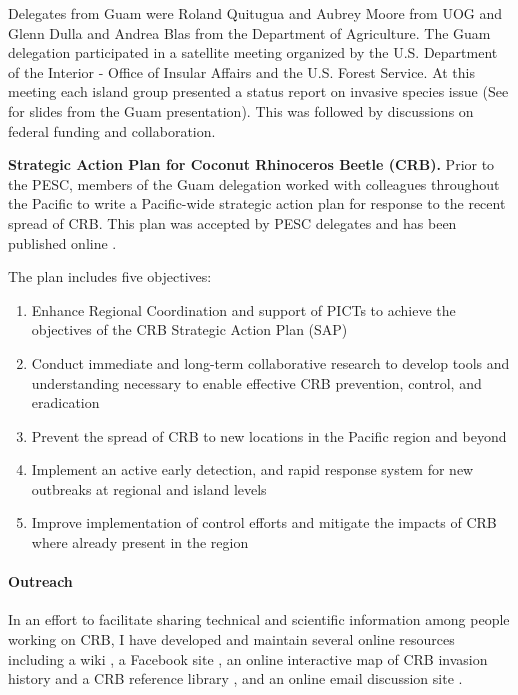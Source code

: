 \begin{refsection}
Delegates from Guam were Roland Quitugua and Aubrey Moore from UOG and Glenn Dulla and Andrea Blas from the Department of Agriculture. The Guam delegation participated in a satellite meeting organized by the U.S. Department of the Interior - Office of Insular Affairs and the U.S. Forest Service. At this meeting each island group presented a status report on invasive species issue (See \parencite{mooreOverviewInvasiveSpecies2022-10-06} for slides from the Guam presentation). This was followed by discussions on federal funding and collaboration.  

\textbf{Strategic Action Plan for Coconut Rhinoceros Beetle (CRB).}
Prior to the PESC, members of the Guam delegation worked with colleagues throughout the Pacific to write a Pacific-wide strategic action plan for response to the recent spread of CRB. This plan was accepted by PESC delegates and has been published online \cite{conferenceStrategicActionPlan2022}.

The plan includes five objectives:

\begin{enumerate}
	\item Enhance Regional Coordination and support of PICTs to achieve the
	objectives of the CRB Strategic Action Plan (SAP)
	\item Conduct immediate and long-term collaborative research to develop
	tools and understanding necessary to enable effective CRB prevention, control, and
	eradication
	\item Prevent the spread of CRB to new locations in the Pacific region and
	beyond
	\item Implement an active early detection, and rapid response system for new
	outbreaks at regional and island levels
	\item Improve implementation of control efforts and mitigate the impacts of
	CRB where already present in the region
	
\end{enumerate} 

\paragraph{Outreach} In an effort to facilitate sharing technical and scientific information among people working on CRB, I have developed and maintain several online resources including a wiki \parencite{moore_crb-g_2019}, a Facebook site \parencite{moore_facebook_2019}, an online interactive map of CRB invasion history \parencite{moore_online_2019} and a CRB reference library \parencite{moore_online_2021}, and an online email discussion site \parencite{moore_online_2021-1}.


\end{refsection}
